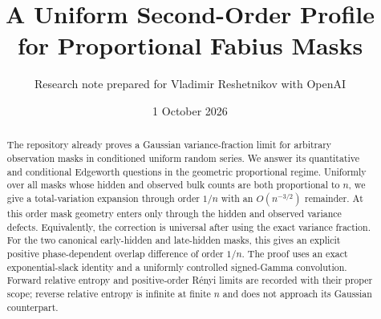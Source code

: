 \documentclass[11pt,a4paper]{article}
\title{A Uniform Second-Order Profile\\for Proportional Fabius Masks}
\author{Research note prepared for Vladimir Reshetnikov with OpenAI}
\date{1 October 2026}
\theoremstyle{remark}\newtheorem*{ednote}{Editorial note (ProveIt, 2026-10-01)}
\begin{document}
\maketitle
\begin{abstract}
The repository already proves a Gaussian variance-fraction limit for arbitrary observation masks in conditioned uniform random series. We answer its quantitative and conditional Edgeworth questions in the geometric proportional regime. Uniformly over all masks whose hidden and observed bulk counts are both proportional to $n$, we give a total-variation expansion through order $1/n$ with an $O(n^{-3/2})$ remainder. At this order mask geometry enters only through the hidden and observed variance defects. Equivalently, the correction is universal after using the exact variance fraction. For the two canonical early-hidden and late-hidden masks, this gives an explicit positive phase-dependent overlap difference of order $1/n$. The proof uses an exact exponential-slack identity and a uniformly controlled signed-Gamma convolution. Forward relative entropy and positive-order R\'enyi limits are recorded with their proper scope; reverse relative entropy is infinite at finite $n$ and does not approach its Gaussian counterpart.
\end{abstract}
\end{document}
